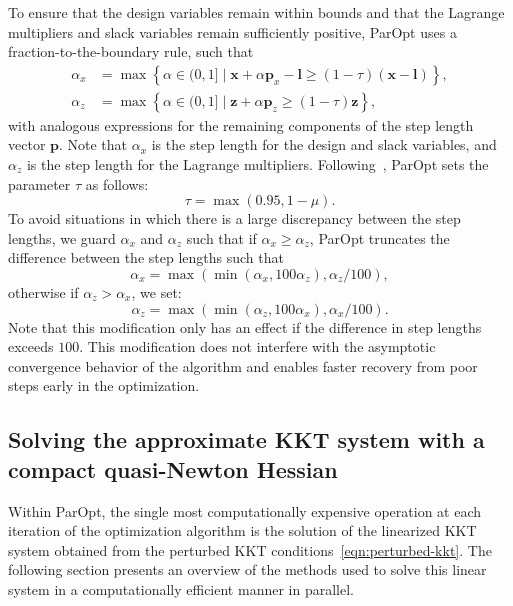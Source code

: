 \documentclass[12pt]{article}
\newcommand{\mb}{\mathbf}
\begin{document}
To ensure that the design variables remain within bounds and that the Lagrange multipliers and slack variables remain sufficiently positive, ParOpt uses a fraction-to-the-boundary rule, such that
%
\begin{equation*}
  \begin{aligned}
    \alpha_{x} & = \max\left\{ \alpha \in (0, 1]\;|\; 
      \mb{x} + \alpha \mb{p}_{x} - \mb{l} \ge (1 - \tau)(\mb{x} - \mb{l}) \right\}, \\
      \alpha_{z} & = \max\left\{ \alpha \in (0, 1]\;|\; 
      \mb{z} + \alpha \mb{p}_{z} \ge (1 - \tau)\mb{z} \right\},
  \end{aligned}
\end{equation*}
%
with analogous expressions for the remaining components of the step length vector $\mb{p}$. Note that $\alpha_{x}$ is the step length for the design and slack variables, and $\alpha_{z}$ is the step length for the Lagrange multipliers. 
Following~\citet{Wachter:2006:IPOPT}, ParOpt sets the parameter $\tau$ as follows:
%
\begin{equation*}
  \tau = \max(0.95, 1 - \mu).
\end{equation*}
To avoid situations in which there is a large discrepancy between the step lengths, we guard $\alpha_{x}$ and $\alpha_{z}$ such that if $\alpha_{x} \ge \alpha_z$, ParOpt truncates the difference between the step lengths such that
%
\begin{equation*}
  \alpha_x = \max(\min(\alpha_x, 100\alpha_z), \alpha_z/100),
\end{equation*}
otherwise if $\alpha_z > \alpha_{x}$, we set:
\begin{equation*}
  \alpha_z = \max(\min(\alpha_z, 100\alpha_x), \alpha_x/100).
\end{equation*}
Note that this modification only has an effect if the difference in step lengths exceeds $100$. 
This modification does not interfere with the asymptotic convergence behavior of the algorithm and enables faster recovery from poor steps early in the optimization.

\subsection{Solving the approximate KKT system with a compact quasi-Newton Hessian}

Within ParOpt, the single most computationally expensive operation at each iteration of the optimization algorithm is the solution of the linearized KKT system obtained from the perturbed KKT conditions~\eqref{eqn:perturbed-kkt}. 
The following section presents an overview of the methods used to solve this linear system in a computationally efficient manner in parallel. 
\end{document}
